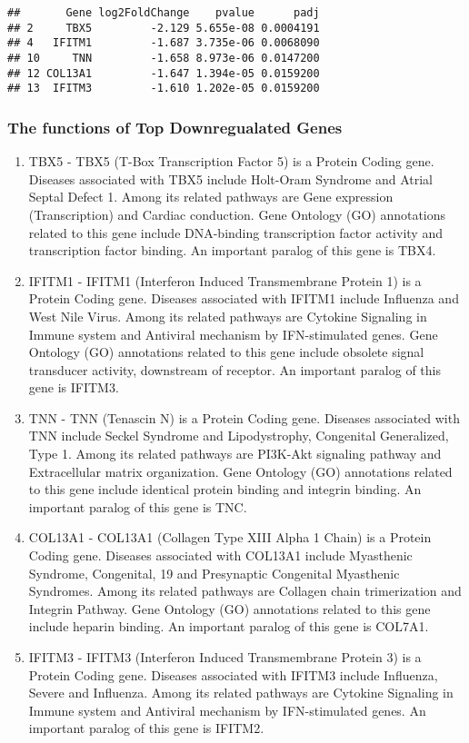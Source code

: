 \documentclass[
]{article}
\providecommand{\tightlist}{%
  \setlength{\itemsep}{0pt}\setlength{\parskip}{0pt}}
\begin{document}
\begin{verbatim}
##       Gene log2FoldChange    pvalue      padj
## 2     TBX5         -2.129 5.655e-08 0.0004191
## 4   IFITM1         -1.687 3.735e-06 0.0068090
## 10     TNN         -1.658 8.973e-06 0.0147200
## 12 COL13A1         -1.647 1.394e-05 0.0159200
## 13  IFITM3         -1.610 1.202e-05 0.0159200
\end{verbatim}

\subsubsection{The functions of Top Downregualated
Genes}\label{the-functions-of-top-downregualated-genes}

\begin{enumerate}
\def\labelenumi{\arabic{enumi}.}
\tightlist
\item
  TBX5 - TBX5 (T-Box Transcription Factor 5) is a Protein Coding gene.
  Diseases associated with TBX5 include Holt-Oram Syndrome and Atrial
  Septal Defect 1. Among its related pathways are Gene expression
  (Transcription) and Cardiac conduction. Gene Ontology (GO) annotations
  related to this gene include DNA-binding transcription factor activity
  and transcription factor binding. An important paralog of this gene is
  TBX4.
\item
  IFITM1 - IFITM1 (Interferon Induced Transmembrane Protein 1) is a
  Protein Coding gene. Diseases associated with IFITM1 include Influenza
  and West Nile Virus. Among its related pathways are Cytokine Signaling
  in Immune system and Antiviral mechanism by IFN-stimulated genes. Gene
  Ontology (GO) annotations related to this gene include obsolete signal
  transducer activity, downstream of receptor. An important paralog of
  this gene is IFITM3.
\item
  TNN - TNN (Tenascin N) is a Protein Coding gene. Diseases associated
  with TNN include Seckel Syndrome and Lipodystrophy, Congenital
  Generalized, Type 1. Among its related pathways are PI3K-Akt signaling
  pathway and Extracellular matrix organization. Gene Ontology (GO)
  annotations related to this gene include identical protein binding and
  integrin binding. An important paralog of this gene is TNC.
\item
  COL13A1 - COL13A1 (Collagen Type XIII Alpha 1 Chain) is a Protein
  Coding gene. Diseases associated with COL13A1 include Myasthenic
  Syndrome, Congenital, 19 and Presynaptic Congenital Myasthenic
  Syndromes. Among its related pathways are Collagen chain trimerization
  and Integrin Pathway. Gene Ontology (GO) annotations related to this
  gene include heparin binding. An important paralog of this gene is
  COL7A1.
\item
  IFITM3 - IFITM3 (Interferon Induced Transmembrane Protein 3) is a
  Protein Coding gene. Diseases associated with IFITM3 include
  Influenza, Severe and Influenza. Among its related pathways are
  Cytokine Signaling in Immune system and Antiviral mechanism by
  IFN-stimulated genes. An important paralog of this gene is IFITM2.
\end{enumerate}
\end{document}
